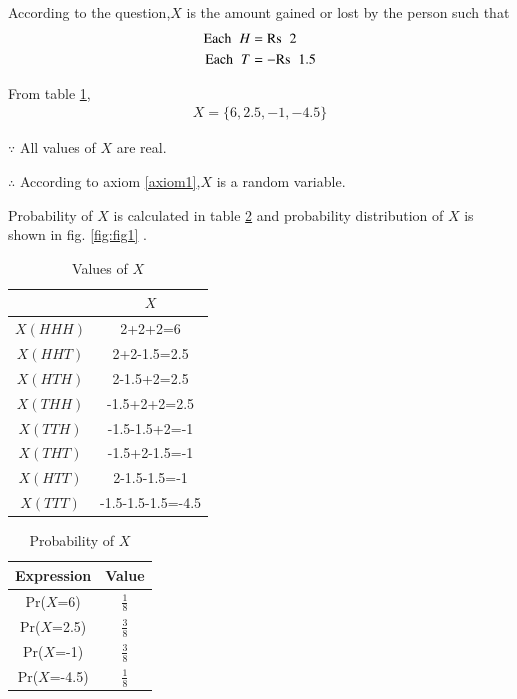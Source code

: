 \documentclass[journal,12pt,twocolumn]{IEEEtran}
\begin{document}
According to the question,$X$ is the amount gained or lost by the person such that 
\begin{align}
    \text{Each} \hspace{0.2cm} H &= \text{Rs} \hspace{0.2cm} 2 \\
    \text{Each} \hspace{0.2cm} T &= -\text{Rs} \hspace{0.2cm} 1.5
\end{align}

From table \ref{tab:table1},
\begin{align}
    X=\{6,2.5,-1,-4.5\}
\end{align}

$\because$ All values of $X$ are real. 

$\therefore$ According to axiom \ref{axiom1},$X$ is a random variable. 

Probability of $X$ is calculated in table \ref{tab:table2} and probability distribution of $X$ is shown in fig. \ref{fig:fig1} .

\begin{table}[!ht]
\centering
\begin{tabular}{|c|c|} 
\hline
 & $X$ \\
\hline
$X(HHH)$ & 2+2+2=6 \\
\hline
$X(HHT)$ & 2+2-1.5=2.5 \\
\hline
$X(HTH)$ & 2-1.5+2=2.5 \\
\hline
$X(THH)$ & -1.5+2+2=2.5 \\
\hline
$X(TTH)$ & -1.5-1.5+2=-1 \\
\hline
$X(THT)$ & -1.5+2-1.5=-1 \\
\hline
$X(HTT)$ & 2-1.5-1.5=-1 \\
\hline
$X(TTT)$ & -1.5-1.5-1.5=-4.5 \\
\hline
\end{tabular}
\caption{Values of $X$}
\label{tab:table1}
\end{table}

\begin{table}[!ht]
\centering
\begin{tabular}{|c|c|} 
\hline
Expression & Value \\
\hline
Pr($X$=6) & $\frac{1}{8}$ \\
\hline
Pr($X$=2.5) & $\frac{3}{8}$ \\
\hline
Pr($X$=-1) & $\frac{3}{8}$ \\
\hline
Pr($X$=-4.5) & $\frac{1}{8}$ \\
\hline
\end{tabular}
\caption{Probability of $X$}
\label{tab:table2}
\end{table}
\end{document}
